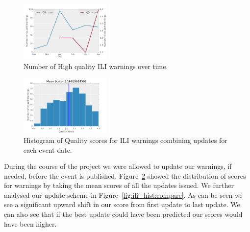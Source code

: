 \begin{figure}
  \includegraphics[width=0.4\textwidth]{../figures/ili/HighQualityWarnings.pdf}
  \caption{\label{fig:ili_temporal}Number of High quality ILI warnings over time.}
\end{figure}

\begin{figure}
  \includegraphics[width=0.4\textwidth]{../figures/ili/CombinedAllScore.pdf}
  \caption{\label{fig:ili_hist_all}Histogram of Quality scores for ILI warnings
  combining updates for each event date.}
\end{figure}



During the course of the project we were allowed to update our warnings, if
needed, before the event is published. Figure~\ref{fig:ili_hist_all} showed
the distribution of scores for warnings by taking the mean scores
of all the updates issued.
We further analysed our update scheme in Figure~\ref{fig:ili_hist:compare}.
As can be seen we see a significant upward shift in our score from first
update to last update. We can also see that if the best update could have
been predicted our scores would have been higher.

